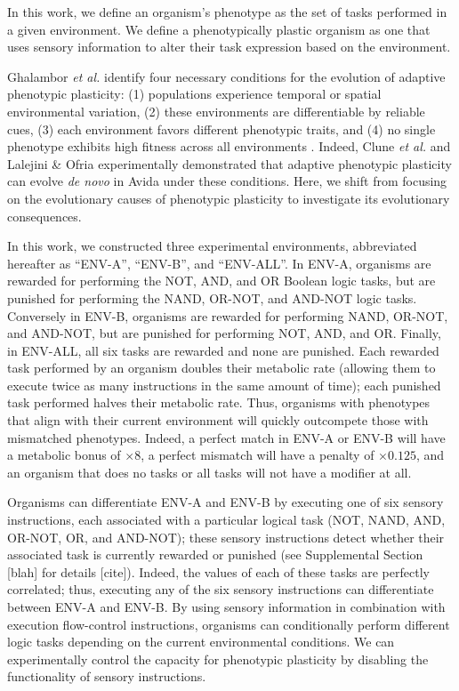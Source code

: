 
In this work, we define an organism's phenotype as the set of tasks performed in a given environment.
We define a phenotypically plastic organism as one that uses sensory information to alter their task expression based on the environment.

Ghalambor \textit{et al.} identify four necessary conditions for the evolution of adaptive phenotypic plasticity: 
(1) populations experience temporal or spatial environmental variation,
(2) these environments are differentiable by reliable cues,
(3) each environment favors different phenotypic traits,
and (4) no single phenotype exhibits high fitness across all environments \citep{ghalambor_behavior_2010}.
Indeed, Clune \textit{et al.} \citep{clune_investigating_2007} and Lalejini \& Ofria \citep{lalejini_evolutionary_2016} experimentally demonstrated that adaptive phenotypic plasticity can evolve \textit{de novo} in Avida under these conditions.
Here, we shift from focusing on the evolutionary causes of phenotypic plasticity to investigate its evolutionary consequences.

In this work, we constructed three experimental environments, abbreviated hereafter as ``ENV-A'', ``ENV-B'', and ``ENV-ALL''.
In ENV-A, organisms are rewarded for performing the NOT, AND, and OR Boolean logic tasks, but are punished for performing the NAND, OR-NOT, and AND-NOT logic tasks.
Conversely in ENV-B, organisms are rewarded for performing NAND, OR-NOT, and AND-NOT, but are punished for performing NOT, AND, and OR.  
Finally, in ENV-ALL, all six tasks are rewarded and none are punished.
Each rewarded task performed by an organism doubles their metabolic rate (allowing them to execute twice as many instructions in the same amount of time); each punished task performed halves their metabolic rate.
Thus, organisms with phenotypes that align with their current environment will quickly outcompete those with mismatched phenotypes.  
Indeed, a perfect match in ENV-A or ENV-B will have a metabolic bonus of $\times{8}$, a perfect mismatch will have a penalty of $\times{0.125}$, and an organism that does no tasks or all tasks will not have a modifier at all. 

Organisms can differentiate ENV-A and ENV-B by executing one of six sensory instructions, each associated with a particular logical task (NOT, NAND, AND, OR-NOT, OR, and AND-NOT); these sensory instructions detect whether their associated task is currently rewarded or punished (see Supplemental Section [blah] for details [cite]).
Indeed, the values of each of these tasks are perfectly correlated; thus, executing any of the six sensory instructions can differentiate between ENV-A and ENV-B. 
By using sensory information in combination with execution flow-control instructions, organisms can conditionally perform different logic tasks depending on the current environmental conditions.
We can experimentally control the capacity for phenotypic plasticity by disabling the functionality of sensory instructions.

